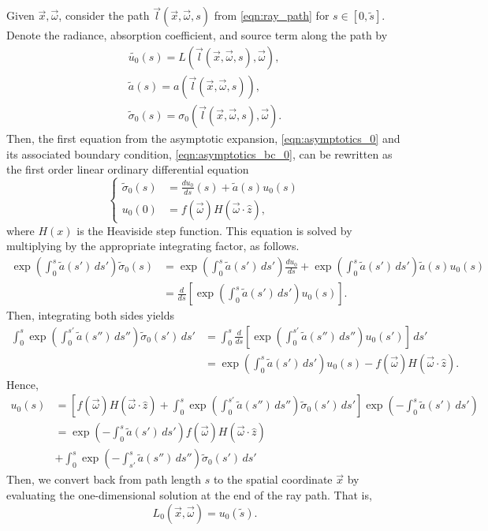 Given $\vec{x}, \vec{\omega}$, consider the path $\vec{l}(\vec{x}, \vec{\omega}, s)$ from \eqref{eqn:ray_path} for $s \in [0, \tilde{s}]$.
Denote the radiance, absorption coefficient, and source term along the path by
\begin{align*}
  \tilde{u_0}(s) = L(\vec{l}(\vec{x}, \vec{\omega}, s), \vec{\omega}), \\
  \tilde{a}(s) = a(\vec{l}(\vec{x}, \vec{\omega}, s)), \\
  \tilde\sigma_0(s) = \sigma_0(\vec{l}(\vec{x}, \vec{\omega}, s), \vec{\omega}).
\end{align*}
Then, the first equation from the asymptotic expansion, \eqref{eqn:asymptotics_0} and its associated boundary condition, \eqref{eqn:asymptotics_bc_0}, can be rewritten as the first order linear ordinary differential equation
\begin{equation}
  \left\{
  \begin{aligned}
  \tilde\sigma_0(s) &= \frac{du_0}{ds}(s) + \tilde{a}(s) u_0(s) \\
  u_0(0) &= f(\vec{\omega})H(\vec{\omega}\cdot\hat{z}),
  \end{aligned}
  \right.
  \label{eqn:asymptotics_ode_0}
\end{equation}
where $H(x)$ is the Heaviside step function.
This equation is solved by multiplying by the appropriate integrating factor, as follows.
\begin{align*}
  \exp\left(\int_0^s \tilde{a}(s')\, ds'\right)\tilde\sigma_0(s) &= \exp\left(\int_0^s \tilde{a}(s')\, ds'\right) \frac{du_0}{ds} + \exp\left(\int_0^s \tilde{a}(s')\, ds'\right) \tilde{a}(s) u_0(s) \\
  &= \frac{d}{ds}\left[\exp\left(\int_0^s \tilde{a}(s')\, ds'\right) u_0(s)\right].
\end{align*}
Then, integrating both sides yields
\begin{align*}
  \int_0^s \exp\left(\int_0^{s'} \tilde{a}(s'')\, ds''\right)\tilde\sigma_0(s')\, ds' &= \int_0^s \frac{d}{ds}\left[\exp\left(\int_0^{s'} \tilde{a}(s'')\, ds''\right) u_0(s')\right]\, ds' \\
  &= \exp\left(\int_0^s \tilde{a}(s')\, ds'\right) u_0(s) - f(\vec{\omega})H(\vec{\omega}\cdot\hat{z}).
\end{align*}
Hence,
\begin{align}
  u_0(s) &= \left[f(\vec{\omega})H(\vec{\omega}\cdot\hat{z}) + \int_0^s \exp\left(\int_0^{s'} \tilde{a}(s'')\, ds''\right) \tilde\sigma_0(s')\, ds'\right] \exp\left(-\int_0^s \tilde{a}(s')\, ds'\right) \nonumber\\
  &= \exp\left(-\int_0^s \tilde{a}(s')\, ds'\right) f(\vec{\omega})H(\vec{\omega}\cdot\hat{z}) \nonumber\\
    &+ \int_0^s \exp\left(-\int_{s'}^s \tilde{a}(s'')\, ds''\right) \tilde\sigma_0(s')\, ds'
  \label{eqn:asymptotics_soln_0}
\end{align}
Then, we convert back from path length $s$ to the spatial coordinate $\vec{x}$ by evaluating the one-dimensional solution at the end of the ray path.
That is,
\begin{equation*}
  L_0(\vec{x}, \vec{\omega}) = u_0(\tilde{s}).
\end{equation*}

